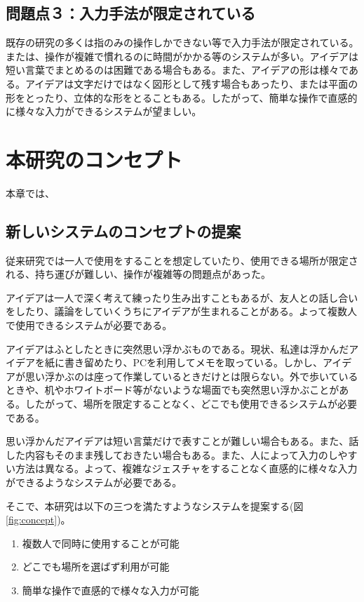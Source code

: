 \documentclass[11pt,a4j, titlepage]{jarticle} %
\begin{document}
\subsection*{問題点３：入力手法が限定されている}
既存の研究の多くは指のみの操作しかできない等で入力手法が限定されている。または、操作が複雑で慣れるのに時間がかかる等のシステムが多い。アイデアは短い言葉でまとめるのは困難である場合もある。また、アイデアの形は様々である。アイデアは文字だけではなく図形として残す場合もあったり、または平面の形をとったり、立体的な形をとることもある。したがって、簡単な操作で直感的に様々な入力ができるシステムが望ましい。

\newpage
\section{本研究のコンセプト}
本章では、

\subsection{新しいシステムのコンセプトの提案} \label{concept}
従来研究では一人で使用をすることを想定していたり、使用できる場所が限定される、持ち運びが難しい、操作が複雑等の問題点があった。

アイデアは一人で深く考えて練ったり生み出すこともあるが、友人との話し合いをしたり、議論をしていくうちにアイデアが生まれることがある。よって複数人で使用できるシステムが必要である。

アイデアはふとしたときに突然思い浮かぶものである。現状、私達は浮かんだアイデアを紙に書き留めたり、PCを利用してメモを取っている。しかし、アイデアが思い浮かぶのは座って作業しているときだけとは限らない。外で歩いているときや、机やホワイトボード等がないような場面でも突然思い浮かぶことがある。したがって、場所を限定することなく、どこでも使用できるシステムが必要である。

思い浮かんだアイデアは短い言葉だけで表すことが難しい場合もある。また、話した内容もそのまま残しておきたい場合もある。また、人によって入力のしやすい方法は異なる。よって、複雑なジェスチャをすることなく直感的に様々な入力ができるようなシステムが必要である。

そこで、本研究は以下の三つを満たすようなシステムを提案する(図\ref{fig:concept})。

\begin{enumerate}[(1)]
 \item 複数人で同時に使用することが可能
 \item どこでも場所を選ばず利用が可能
 \item 簡単な操作で直感的で様々な入力が可能
\end{enumerate}
\end{document}
